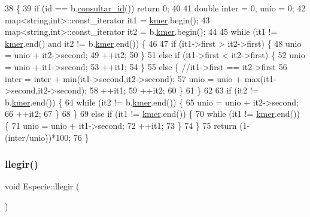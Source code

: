 \begin{DoxyCode}
38                                                          \{
39     \textcolor{keywordflow}{if} (\textcolor{keywordtype}{id} == b.\hyperlink{class_especie_a1652f05cd2ff7dc71123bf538ecc4476}{consultar\_id}()) \textcolor{keywordflow}{return} 0;
40     
41     \textcolor{keywordtype}{double} inter = 0, unio = 0;    
42     map<string,int>::const\_iterator it1 = \hyperlink{class_especie_ab6740db160f2d7335a98fa8d9f745cbe}{kmer}.begin();
43     map<string,int>::const\_iterator it2 = b.\hyperlink{class_especie_ab6740db160f2d7335a98fa8d9f745cbe}{kmer}.begin();
44     
45     \textcolor{keywordflow}{while} (it1 != \hyperlink{class_especie_ab6740db160f2d7335a98fa8d9f745cbe}{kmer}.end() and it2 != b.\hyperlink{class_especie_ab6740db160f2d7335a98fa8d9f745cbe}{kmer}.end()) \{ 
46         
47         \textcolor{keywordflow}{if} (it1->first > it2->first) \{
48             unio = unio + it2->second;
49             ++it2;
50         \}
51         \textcolor{keywordflow}{else} \textcolor{keywordflow}{if} (it1->first < it2->first) \{
52             unio = unio + it1->second;
53             ++it1;
54         \}
55         \textcolor{keywordflow}{else} \{ \textcolor{comment}{//it1->first == it2->first}
56             inter = inter + min(it1->second,it2->second);
57             unio = unio + max(it1->second,it2->second);
58             ++it1;
59             ++it2;
60         \}
61     \}    
62     
63     \textcolor{keywordflow}{if} (it2 != b.\hyperlink{class_especie_ab6740db160f2d7335a98fa8d9f745cbe}{kmer}.end()) \{
64         \textcolor{keywordflow}{while} (it2 != b.\hyperlink{class_especie_ab6740db160f2d7335a98fa8d9f745cbe}{kmer}.end()) \{
65             unio = unio + it2->second;
66             ++it2;
67         \}
68     \}
69     \textcolor{keywordflow}{else} \textcolor{keywordflow}{if} (it1 != \hyperlink{class_especie_ab6740db160f2d7335a98fa8d9f745cbe}{kmer}.end()) \{
70         \textcolor{keywordflow}{while} (it1 != \hyperlink{class_especie_ab6740db160f2d7335a98fa8d9f745cbe}{kmer}.end()) \{
71             unio = unio + it1->second;
72             ++it1;
73         \}
74     \}
75     \textcolor{keywordflow}{return} (1-(inter/unio))*100;
76 \}
\end{DoxyCode}
\mbox{\label{class_especie_a7384add391d2684c4fb6bdf8a535fba3}} 
\subsubsection{\texorpdfstring{llegir()}{llegir()}}
{\footnotesize\ttfamily void Especie\+::llegir (\begin{DoxyParamCaption}{ }\end{DoxyParamCaption})}



